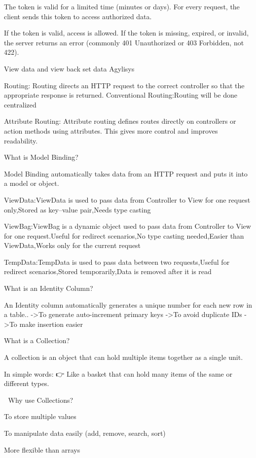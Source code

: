 The token is valid for a limited time (minutes or days).
For every request, the client sends this token to access authorized data.

If the token is valid, access is allowed.
If the token is missing, expired, or invalid, the server returns an error
(commonly 401 Unauthorized or 403 Forbidden, not 422).


View data and view back set data
Agylisys

Routing:
        Routing directs an HTTP request to the correct controller so that the appropriate response is returned.
        Conventional Routing:Routing will be done centralized

        Attribute Routing:
        Attribute routing defines routes directly on controllers or action methods using attributes.
        This gives more control and improves readability.

What is Model Binding?

Model Binding automatically takes data from an HTTP request and puts it into a model or object.

ViewData:ViewData is used to pass data from Controller to View for one request only,Stored as key–value pair,Needs type casting

ViewBag:ViewBag is a dynamic object used to pass data from Controller to View for one request.Useful for redirect scenarios,No type casting needed,Easier than ViewData,Works only for the current request

TempData:TempData is used to pass data between two requests,Useful for redirect scenarios,Stored temporarily,Data is removed after it is read


What is an Identity Column?

An Identity column automatically generates a unique number for each new row in a table..
->To generate auto-increment primary keys
->To avoid duplicate IDs
->To make insertion easier

What is a Collection?

A collection is an object that can hold multiple items together as a single unit.

In simple words:
👉 Like a basket that can hold many items of the same or different types.

🔹 Why use Collections?

To store multiple values

To manipulate data easily (add, remove, search, sort)

More flexible than arrays

